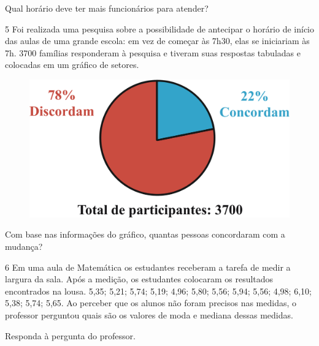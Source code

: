 Qual horário deve ter mais funcionários para atender?



\pagebreak
\num{5} Foi realizada uma pesquisa sobre a possibilidade de antecipar o horário
de início das aulas de uma grande escola: em vez de começar às 7h30, elas se iniciariam
às 7h. 3700 famílias responderam à pesquisa e tiveram suas respostas tabuladas e
colocadas em um gráfico de setores.

\begin{figure}[htpb!]
\centering
\includegraphics[width=\textwidth]{./ilustras-mat/modulo_13-atividade_5.png}
\end{figure}

Com base nas informações do gráfico, quantas pessoas concordaram com a mudança?



\num{6} Em uma aula de Matemática os estudantes receberam a tarefa de medir a
largura da sala. Após a medição, os estudantes colocaram os resultados
encontrados na lousa. 5,35; 5,21; 5,74; 5,19; 4,96; 5,80; 5,56; 5,94; 5,56; 
4,98; 6,10; 5,38; 5,74; 5,65. Ao perceber que os alunos não foram precisos nas
medidas, o professor perguntou quais são os valores de moda e mediana dessas medidas.

Responda à pergunta do professor.

\begin{emptybox}

\end{emptybox}

